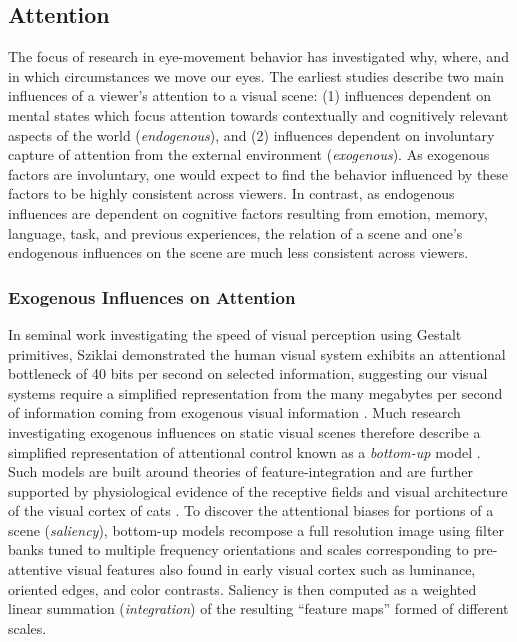 \documentclass[a4paper,10pt,final]{ThesisStyle}
\begin{document}
\subsection{Attention}

The focus of research in eye-movement behavior has investigated why, where, and in which circumstances we move our eyes.  The earliest studies \cite{Buswell1935,Yarbus1967} describe two main influences of a viewer's attention to a visual scene: (1) influences dependent on mental states which focus attention towards contextually and cognitively relevant aspects of the world (\textit{endogenous}), and (2) influences dependent on involuntary capture of attention from the external environment (\textit{exogenous}).  As exogenous factors are involuntary, one would expect to find the behavior influenced by these factors to be highly consistent across viewers.  In contrast, as endogenous influences are dependent on cognitive factors resulting from emotion, memory, language, task, and previous experiences, the relation of a scene and one's endogenous influences on the scene are much less consistent across viewers.  

\subsubsection{Exogenous Influences on Attention}

In seminal work investigating the speed of visual perception using Gestalt primitives, Sziklai demonstrated the human visual system exhibits an attentional bottleneck of 40 bits per second on selected information, suggesting our visual systems require a simplified representation from the many megabytes per second of information coming from exogenous visual information \cite{Sziklai1956,Merrill1968}.  Much research investigating exogenous influences on static visual scenes therefore describe a simplified representation of attentional control known as a \textit{bottom-up} model \cite{Koch1985,Itti1998,Wolfe1989,Itti2001}.  Such models are built around theories of feature-integration \cite{Treisman1980} and are further supported by physiological evidence of the receptive fields and visual architecture of the visual cortex of cats \cite{Hubel1962}.  To discover the attentional biases for portions of a scene (\textit{saliency}), bottom-up models recompose a full resolution image using filter banks tuned to multiple frequency orientations and scales corresponding to pre-attentive visual features also found in early visual cortex such as luminance, oriented edges, and color contrasts.  Saliency is then computed as a weighted linear summation (\textit{integration}) of the resulting ``feature maps'' formed of different scales. 
\end{document}
